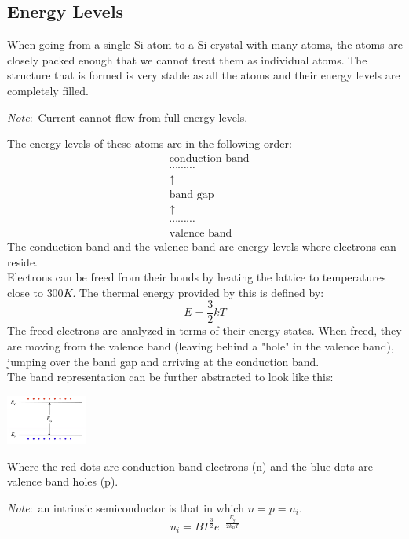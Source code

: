 \documentclass[nobib]{tufte-handout}
\newcommand{\note}[1]{
        \begin{notebox}
        \noindent\textit{Note}:\ #1
        \end{notebox}
}
\begin{document}
\subsection{Energy Levels}
When going from a single Si atom to a Si crystal with many atoms, the atoms are closely packed enough that we cannot treat them as individual atoms. The structure that is formed is very stable as all the atoms and their energy levels are completely filled.\\
\note{Current cannot flow from full energy levels.}
The energy levels of these atoms are in the following order:
\begin{eqnarray*}
    &\text{conduction band}\\
    &\cdots \cdots \cdots \\
    &\uparrow \\
    &\text{band gap}\\
    &\uparrow \\
    &\cdots \cdots \cdots \\
    &\text{valence band}
\end{eqnarray*}
The conduction band and the valence band are energy levels where electrons can reside.\\
Electrons can be freed from their bonds by heating the lattice to temperatures close to $300K$. The thermal energy provided by this is defined by:
\begin{equation*}
    E = \frac{3}{2}kT
\end{equation*}
The freed electrons are analyzed in terms of their energy states. When freed, they are moving from the valence band (leaving behind a "hole" in the valence band), jumping over the band gap and arriving at the conduction band.\\
The band representation can be further abstracted to look like this:
\begin{center}
    \includegraphics*[width = 100px]{images/band_diagram_abstraction.png}
\end{center}
Where the red dots are conduction band electrons (n) and the blue dots are valence band holes (p).
\note{an intrinsic semiconductor is that in which $n = p = n_i$. 
\begin{equation*}
n_i = BT^{\frac{3}{2}}e^{-\frac{E_g}{2k_B T}}
\end{equation*}
}
\end{document}
